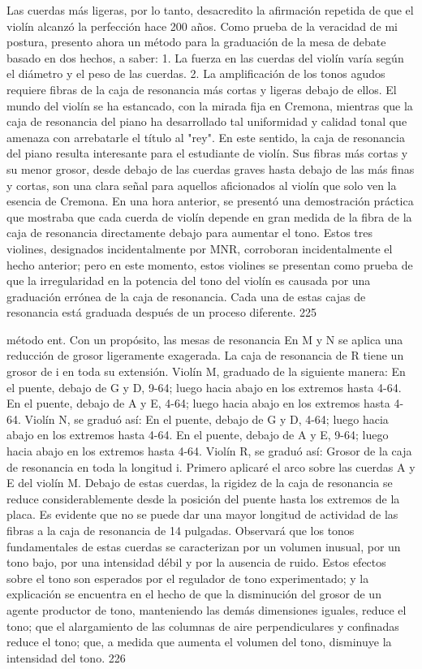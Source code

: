 Las cuerdas más ligeras, por lo tanto, desacredito la afirmación repetida de que el violín alcanzó la perfección hace 200 años.
Como prueba de la veracidad de mi postura, presento ahora un método para la graduación de la mesa de debate basado en dos hechos, a saber:
1. La fuerza en las cuerdas del violín varía según el diámetro y el peso de las cuerdas.
2. La amplificación de los tonos agudos requiere fibras de la caja de resonancia más cortas y ligeras debajo de ellos.
El mundo del violín se ha estancado, con la mirada fija en Cremona, mientras que la caja de resonancia del piano ha desarrollado tal uniformidad y calidad tonal que amenaza con arrebatarle el título al "rey". En este sentido, la caja de resonancia del piano resulta interesante para el estudiante de violín. Sus fibras más cortas y su menor grosor, desde debajo de las cuerdas graves hasta debajo de las más finas y cortas, son una clara señal para aquellos aficionados al violín que solo ven la esencia de Cremona.
En una hora anterior, se presentó una demostración práctica que mostraba que cada cuerda de violín depende en gran medida de la fibra de la caja de resonancia directamente debajo para aumentar el tono. Estos tres violines, designados incidentalmente por MNR, corroboran incidentalmente el hecho anterior; pero en este momento, estos violines se presentan como prueba de que la irregularidad en la potencia del tono del violín es causada por una graduación errónea de la caja de resonancia. Cada una de estas cajas de resonancia está graduada después de un proceso diferente.
225

método ent. Con un propósito, las mesas de resonancia
En M y N se aplica una reducción de grosor ligeramente exagerada. La caja de resonancia de R tiene un grosor de i en toda su extensión. Violín M, graduado de la siguiente manera:
En el puente, debajo de G y D, 9-64; luego hacia abajo en los extremos hasta 4-64.
En el puente, debajo de A y E, 4-64; luego hacia abajo
en los extremos hasta 4-64.
Violín N, se graduó así:
En el puente, debajo de G y D, 4-64; luego hacia abajo en los extremos hasta 4-64.
En el puente, debajo de A y E, 9-64; luego hacia abajo
en los extremos hasta 4-64.
Violín R, se graduó así:
Grosor de la caja de resonancia en toda la longitud i.
Primero aplicaré el arco sobre las cuerdas A y E del violín M. Debajo de estas cuerdas, la rigidez de la caja de resonancia se reduce considerablemente desde la posición del puente hasta los extremos de la placa. Es evidente que no se puede dar una mayor longitud de actividad de las fibras a la caja de resonancia de 14 pulgadas. Observará que los tonos fundamentales de estas cuerdas se caracterizan por un volumen inusual, por un tono bajo, por una intensidad débil y por la ausencia de ruido. Estos efectos sobre el tono son esperados por el regulador de tono experimentado; y la explicación se encuentra en el hecho de que la disminución del grosor de un agente productor de tono, manteniendo las demás dimensiones iguales, reduce el tono; que el alargamiento de las columnas de aire perpendiculares y confinadas reduce el tono; que, a medida que aumenta el volumen del tono, disminuye la intensidad del tono.
226

